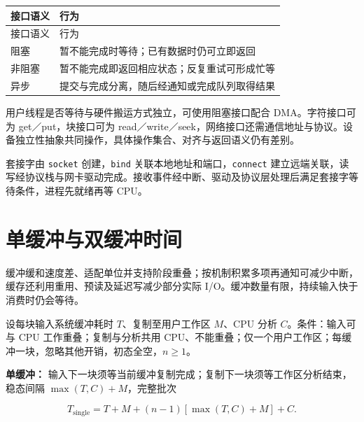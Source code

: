 \par\smallskip
{\fontsize{9.3}{12}\selectfont\setlength{\tabcolsep}{2.5pt}\setlength{\LTleft}{0pt}\setlength{\LTright}{0pt}
\begin{longtable}{@{}>{\raggedright\arraybackslash}p{}>{\raggedright\arraybackslash}p{}@{}}
\toprule
接口语义 & 行为 \\

\midrule\endfirsthead\toprule
接口语义 & 行为 \\

\midrule\endhead\bottomrule\endfoot
阻塞 & 暂不能完成时等待；已有数据时仍可立即返回 \\

非阻塞 & 暂不能完成即返回相应状态；反复重试可形成忙等 \\

异步 & 提交与完成分离，随后经通知或完成队列取得结果 \\

\end{longtable}}
\par\smallskip

用户线程是否等待与硬件搬运方式独立，可使用阻塞接口配合 DMA。字符接口可为 get／put，块接口可为 read／write／seek，网络接口还需通信地址与协议。设备独立性抽象共同操作，具体操作集合、对齐与返回语义仍有差别。

套接字由 \texttt{socket} 创建，\texttt{bind} 关联本地地址和端口，\texttt{connect} 建立远端关联，读写经协议栈与网卡驱动完成。接收事件经中断、驱动及协议层处理后满足套接字等待条件，进程先就绪再等 CPU。

\section{单缓冲与双缓冲时间}\label{OS05-buffer-time}

缓冲缓和速度差、适配单位并支持阶段重叠；按机制积累多项再通知可减少中断，缓存还利用重用、预读及延迟写减少部分实际 I/O。缓冲数量有限，持续输入快于消费时仍会等待。

设每块输入系统缓冲耗时 \(T\)、复制至用户工作区 \(M\)、CPU 分析 \(C\)。条件：输入可与 CPU 工作重叠；复制与分析共用 CPU、不能重叠；仅一个用户工作区；每缓冲一块，忽略其他开销，初态全空，\(n\ge1\)。

\textbf{单缓冲：} 输入下一块须等当前缓冲复制完成；复制下一块须等工作区分析结束，稳态间隔 \(\max(T,C)+M\)，完整批次

\[T_{\mathrm{single}}=T+M+(n-1)[\max(T,C)+M]+C.\]

